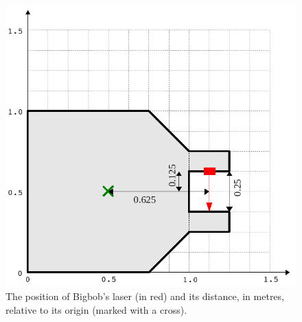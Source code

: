 \documentclass[a4paper]{article}
\begin{document}
\begin{figure}
	\centering
	\includegraphics[width=0.6\linewidth]{./pics/robot_building/bigbob_laser.png} 
	\caption{The position of Bigbob's laser (in red) and its distance, in metres, relative to its origin (marked with a cross).}
	\label{fig:laserdrawing}
\end{figure}
\end{document}
